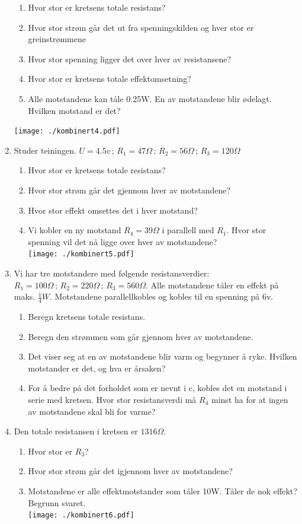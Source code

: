 \documentclass[12pt,a4paper]{article}
\begin{document}
\begin{enumerate}
\begin{enumerate}
\item Hvor stor er kretsens totale resistans?
\item Hvor stor strøm går det ut fra spenningskilden og hver stor er greinstrømmene
\item Hvor stor spenning ligger det over hver av resistansene?
\item Hvor stor er kretsens totale effektomsetning?
\item Alle motstandene kan tåle 0.25W. En av motstandene blir ødelagt. Hvilken
motstand er det?
\end{enumerate}
\texttt{[image: ./kombinert4.pdf]}
\item Studer teiningen. $U=4.5v\,;\,R_{1}=47\Omega\,;\,R_{2}=56\Omega\,;\,R_{3}=120\Omega$

\begin{enumerate}
\item Hvor stor er kretsens totale resistans?
\item Hvor stor strøm går det gjennom hver av motstandene?
\item Hvor stor effekt omsettes det i hver motstand?
\item Vi kobler en ny motstand $R_{4}=39\Omega$ i parallell med $R_{1}$.
Hvor stor spenning vil det nå ligge over hver av motstandene?\\
\texttt{[image: ./kombinert5.pdf]}
\end{enumerate}
\item Vi har tre motstandere med følgende resistansverdier: \foreignlanguage{english}{$R_{1}=100\Omega\,;\,R_{2}=220\Omega\,;\,R_{3}=560\Omega$}.
Alle motstandene tåler en effekt på maks. $\frac{1}{4}W$. Motstandene
parallellkobles og kobles til en spenning på 6v. 

\begin{enumerate}
\item Beregn kretsens totale resistans.
\item Beregn den strømmen som går gjennom hver av motstandene. 
\item Det viser seg at en av motstandene blir varm og begynner å ryke. Hvilken
motstander er det, og hva er årsaken?
\item For å bedre på det forholdet som er nevnt i c, kobles det en motstand
i serie med kretsen. Hvor stor resistansverdi må $R_{4}$ minst ha
for at ingen av motstandene skal bli for varme?
\end{enumerate}
\item Den totale resistansen i kretsen er $1316\Omega.$

\begin{enumerate}
\item Hvor stor er $R_{3}$?
\item Hvor stor strøm går det igjennom hver av motstandene?
\item Motstandene er alle effektmotstander som tåler 10W. Tåler de nok effekt?
Begrunn svaret.\\
\texttt{[image: ./kombinert6.pdf]}
\end{enumerate}
\end{enumerate}
\end{document}
